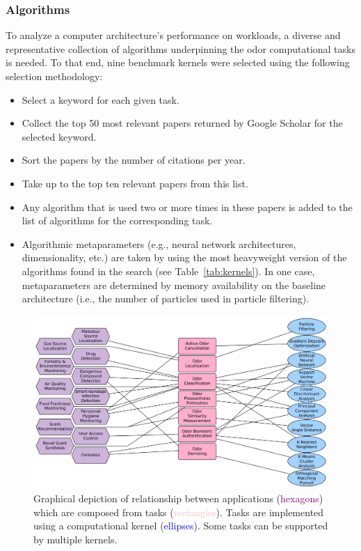\subsubsection{Algorithms}

To analyze a computer architecture's performance on \olfc{} workloads, a
diverse and representative collection of \olfc{} algorithms underpinning the
odor computational tasks is needed. To that end, nine benchmark kernels
were selected using the following selection methodology:
\begin{itemize}
    \item Select a keyword for each given \olfc{} task.
    \item Collect the top 50 most relevant papers returned by Google Scholar
          for the selected keyword.
    \item Sort the papers by the number of citations per year.
    \item Take up to the top ten relevant papers from this list.
    \item Any algorithm that is used two or more times in these papers is added
          to the list of algorithms for the corresponding task.
    \item Algorithmic metaparameters (e.g., neural network architectures,
          dimensionality, etc.) are taken by using the most heavyweight version
          of the algorithms found in the search (see Table~\ref{tab:kernels}).
          In one case, metaparameters
          are determined by memory availability on the baseline architecture
          (i.e., the number of particles used in particle filtering).
\end{itemize}


\begin{figure}
    \includegraphics[width=\linewidth]{./figs/app_task_kernel.png}
    \caption{
        \small Graphical depiction of relationship between applications
        (\textcolor{purple}{hexagons}) which are composed from tasks
        (\textcolor{pink}{rectangles}).  Tasks are implemented using a
        computational kernel (\textcolor{blue}{ellipses}). Some tasks can be
        supported by multiple kernels.
    }
    \label{fig:app_task_kernel}
\end{figure}

